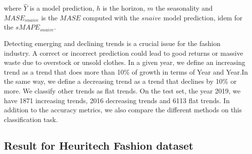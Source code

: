 \documentclass{article} %
\newcommand{\lag}{h}
\begin{document}
where $\hat{Y}$ is a model prediction, $\lag$ is the horizon, $m$ the seasonality and $MASE_{snaive}$ is the $MASE$ computed with the $snaive$ model prediction, idem for the $sMAPE_{snaive}$.

Detecting emerging and declining trends is a crucial issue for the fashion industry. A correct or incorrect prediction could lead to good returns or massive waste due to overstock or unsold clothes. In a given year, we define an increasing trend as a trend that does more than 10\% of growth in terms of Year and Year.In the same way, we define a decreasing trend as a trend that declines by 10\% or more. We classify other trends as flat trends. On the test set, the year 2019, we have 1871 increasing trends, 2016 decreasing trends and 6113 flat trends. In addition to the accuracy metrics, we also compare the different methods on this classification task.













\subsection{Result for Heuritech Fashion dataset}


\end{document}
